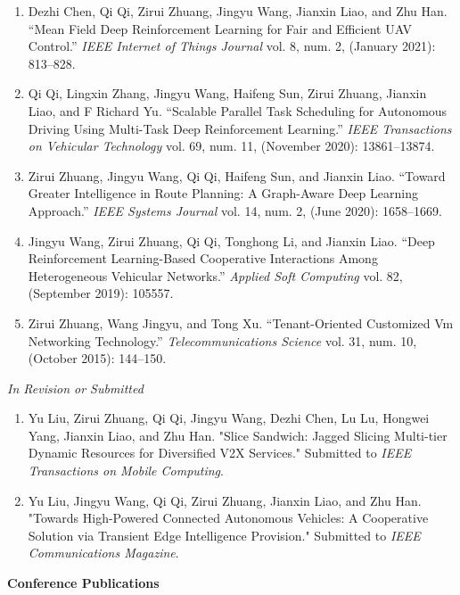 \documentclass[letterpaper,11pt]{article}
\newcommand{\contentlength}{5.25in} %
\begin{document}
\begin{tcolorbox}[flush right,breakable,colback=white,colframe=white,width=\contentlength]
\begin{enumerate}[itemsep=0mm]
			\item Dezhi Chen, Qi Qi, Zirui Zhuang, Jingyu Wang, Jianxin Liao, and Zhu Han. “Mean Field Deep Reinforcement Learning for Fair and Efficient UAV Control.” \textit{IEEE Internet of Things Journal} vol. 8, num. 2, (January 2021): 813–828.
			\item Qi Qi, Lingxin Zhang, Jingyu Wang, Haifeng Sun, Zirui Zhuang, Jianxin Liao, and F Richard Yu. “Scalable Parallel Task Scheduling for Autonomous Driving Using Multi-Task Deep Reinforcement Learning.” \textit{IEEE Transactions on Vehicular Technology} vol. 69, num. 11, (November 2020): 13861–13874.
			\item  Zirui Zhuang, Jingyu Wang, Qi Qi, Haifeng Sun, and Jianxin Liao. “Toward Greater Intelligence in Route Planning: A Graph-Aware Deep Learning Approach.” \textit{IEEE Systems Journal} vol. 14, num. 2, (June 2020): 1658–1669.
			\item Jingyu Wang, Zirui Zhuang, Qi Qi, Tonghong Li, and Jianxin Liao. “Deep Reinforcement Learning-Based Cooperative Interactions Among Heterogeneous Vehicular Networks.” \textit{Applied Soft Computing} vol. 82, (September 2019): 105557.
			\item Zirui Zhuang, Wang Jingyu, and Tong Xu. “Tenant-Oriented Customized Vm Networking Technology.” \textit{Telecommunications Science} vol. 31, num. 10, (October 2015): 144–150.
		\end{enumerate}
		
		\textit{In Revision or Submitted}
		\begin{enumerate}[itemsep=0mm,resume]
			\item Yu Liu, Zirui Zhuang, Qi Qi, Jingyu Wang, Dezhi Chen, Lu Lu, Hongwei Yang, Jianxin Liao, and Zhu Han. "Slice Sandwich: Jagged Slicing Multi-tier Dynamic Resources for Diversified V2X Services." Submitted to \textit{IEEE Transactions on Mobile Computing}.
			\item Yu Liu, Jingyu Wang, Qi Qi, Zirui Zhuang, Jianxin Liao, and Zhu Han. "Towards High-Powered Connected Autonomous Vehicles: A Cooperative Solution via Transient Edge Intelligence Provision." Submitted to \textit{IEEE Communications Magazine}.
		\end{enumerate}
		
		\textbf{Conference Publications}
		

\end{tcolorbox}
\end{document}
